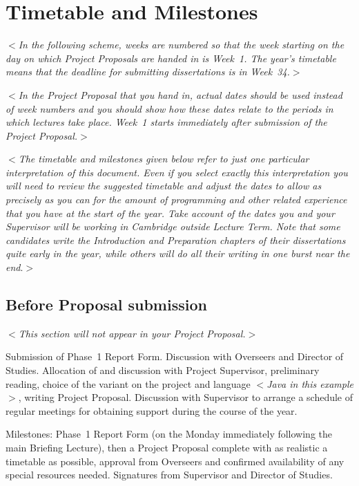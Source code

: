 \documentclass[12pt]{article}
\newcommand{\al}{$<$}
\newcommand{\ar}{$>$}
\begin{document}
\section*{Timetable and Milestones}

\al\emph{In the following scheme, weeks are numbered so that the week
  starting on the day on which Project Proposals are handed in is
  Week~1.  The year's timetable means that the deadline for submitting
  dissertations is in Week~34.}\ar

\al\emph{In the Project Proposal that you hand in, {\rm actual dates}
  should be used instead of week numbers and you should show how these
  dates relate to the periods in which lectures take place. Week~1
  starts immediately after submission of the Project Proposal.}\ar

\al\emph{The timetable and milestones given below refer to just one
  particular interpretation of this document.  Even if you select
  exactly this interpretation you will need to review the suggested
  timetable and adjust the dates to allow as precisely as you can for
  the amount of programming and other related experience that you have
  at the start of the year.  Take account of the dates you and your
  Supervisor will be working in Cambridge outside Lecture Term.  Note
  that some candidates write the Introduction and Preparation chapters
  of their dissertations quite early in the year, while others will do
  all their writing in one burst near the end}.\ar


\subsection*{Before Proposal submission}

\al\emph{This section will not appear in your Project Proposal.}\ar

Submission of Phase~1 Report Form. Discussion with Overseers and
Director of Studies.  Allocation of and discussion with Project
Supervisor, preliminary reading, choice of the variant on the project
and language \al\emph{Java in this example\/}\ar, writing Project
Proposal.  Discussion with Supervisor to arrange a schedule of regular
meetings for obtaining support during the course of the year.

Milestones: Phase~1 Report Form (on the Monday immediately following
the main Briefing Lecture), then a Project Proposal complete with as
realistic a timetable as possible, approval from Overseers and
confirmed availability of any special resources needed. Signatures
from Supervisor and Director of Studies.
\end{document}
